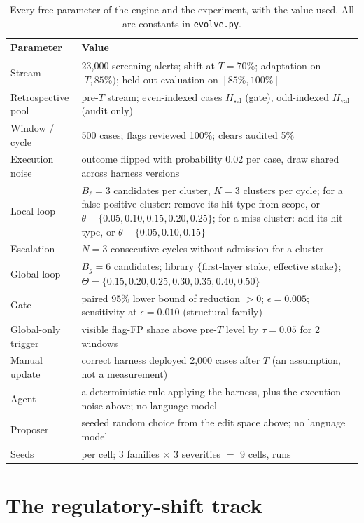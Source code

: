 \documentclass[11pt]{article}
\newcommand{\Hsel}{H_{\mathrm{sel}}}
\newcommand{\Hval}{H_{\mathrm{val}}}
\begin{document}
\begin{table}[t]
\centering\small
\caption{Every free parameter of the engine and the experiment, with the value used. All are constants in \texttt{evolve.py}.}
\label{tab:constants}
\begin{tabularx}{\linewidth}{lX}
\toprule
Parameter & Value\\
\midrule
Stream & 23{,}000 screening alerts; shift at $T = 70\%$; adaptation on $[T, 85\%)$; held-out evaluation on $[85\%, 100\%]$\\
Retrospective pool & pre-$T$ stream; even-indexed cases $\Hsel$ (gate), odd-indexed $\Hval$ (audit only)\\
Window / cycle & 500 cases; flags reviewed 100\%; clears audited 5\%\\
Execution noise & outcome flipped with probability 0.02 per case, draw shared across harness versions\\
Local loop & $B_\ell = 3$ candidates per cluster, $K = 3$ clusters per cycle; for a false-positive cluster: remove its hit type from scope, or $\theta + \{0.05, 0.10, 0.15, 0.20, 0.25\}$; for a miss cluster: add its hit type, or $\theta - \{0.05, 0.10, 0.15\}$\\
Escalation & $N = 3$ consecutive cycles without admission for a cluster\\
Global loop & $B_g = 6$ candidates; library $\{$first-layer stake, effective stake$\}$; $\Theta = \{0.15, 0.20, 0.25, 0.30, 0.35, 0.40, 0.50\}$\\
Gate & paired 95\% lower bound of reduction $>0$; $\epsilon = 0.005$; sensitivity at $\epsilon = 0.010$ (structural family)\\
Global-only trigger & visible flag-FP share above pre-$T$ level by $\tau = 0.05$ for 2 windows\\
Manual update & correct harness deployed 2{,}000 cases after $T$ (an assumption, not a measurement)\\
Agent & a deterministic rule applying the harness, plus the execution noise above; no language model\\
Proposer & seeded random choice from the edit space above; no language model\\
Seeds & \nseeds{} per cell; 3 families $\times$ 3 severities $=$ 9 cells, \ncells{} runs\\
\bottomrule
\end{tabularx}
\end{table}

\section{The regulatory-shift track}
\label{sec:design}
\end{document}
